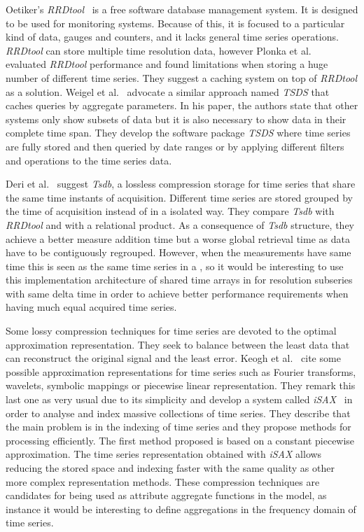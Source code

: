 Oetiker's \emph{RRDtool}~\cite{rrdtool,lisa98:oetiker} is a free
software database management system. It is designed to be used for
monitoring systems. Because of this, it is focused to a particular
kind of data, gauges and counters, and it lacks general time series
operations. \emph{RRDtool} can store multiple time resolution data,
however Plonka et al.~\cite{lisa07:plonka} evaluated \emph{RRDtool}
performance and found limitations when storing a huge number of
different time series. They suggest a caching system on top of
\emph{RRDtool} as a solution.
%
Weigel et al.~\cite{weigel10} advocate a similar approach named
\emph{TSDS} that caches queries by aggregate parameters.  In his
paper, the authors state that other systems only show subsets of data
but it is also necessary to show data in their complete time span.
They develop the software package \emph{TSDS} where time series are
fully stored and then queried by date ranges or by applying different
filters and operations to the time series data.  

Deri et al.~\cite{deri12:tsdb_compressed_database} suggest
\emph{Tsdb}, a lossless compression storage  for time
series that share the same time instants of acquisition. Different
time series are stored grouped by the time of acquisition instead of
in a isolated way.  They compare \emph{Tsdb} with \emph{RRDtool} and
with a relational product. As a consequence of \emph{Tsdb} structure,
they achieve a better measure addition time but a worse global
retrieval time as data have to be contiguously regrouped. However,
when the measurements have same time this is seen as the same time
series in a , so it would be interesting to use this
implementation architecture of shared time arrays in  for
resolution subseries with same delta time in order to achieve better
performance requirements when having much equal acquired time series.

Some lossy compression techniques for time series are devoted to the
optimal approximation representation. They seek to balance between the
least data that can reconstruct the original signal and the least
error. Keogh et al.~\cite{keogh01} cite some possible approximation
representations for time series such as Fourier transforms, wavelets,
symbolic mappings or piecewise linear representation. They remark this
last one as very usual due to its simplicity and develop a system
called \emph{iSAX}~\cite{keogh08:isax,keogh10:isax} in order to
analyse and index massive collections of time series. They describe
that the main problem is in the indexing of time series and they
propose methods for processing efficiently. The first method proposed
is based on a constant piecewise approximation. The time series
representation obtained with \emph{iSAX} allows reducing the stored
space and indexing faster with the same quality as other more complex
representation methods.  These compression techniques are candidates
for being used as attribute aggregate functions in the 
model, as instance it would be interesting to define aggregations in
the frequency domain of time series.


